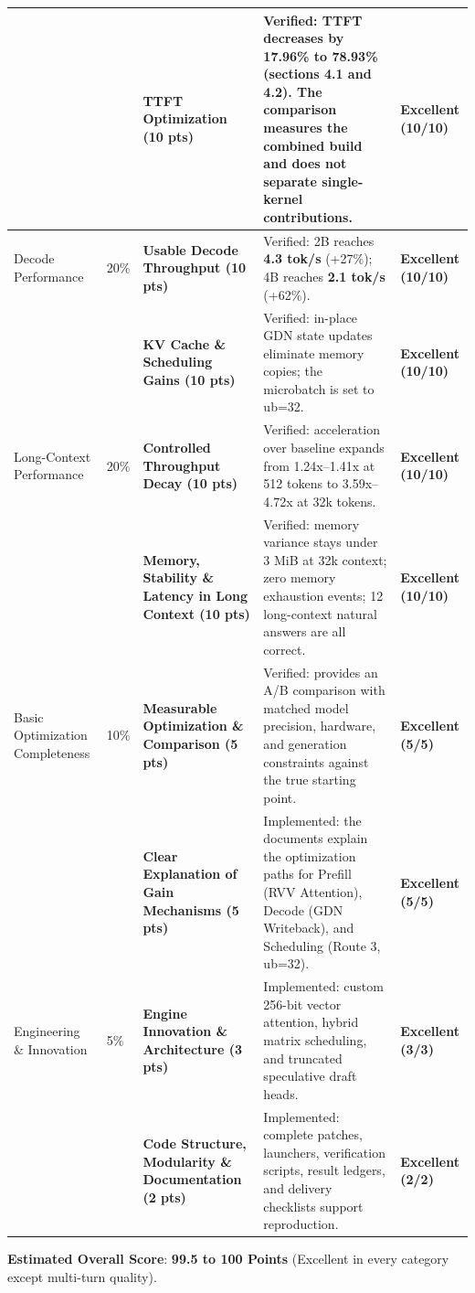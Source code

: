 \documentclass[10pt,a4paper]{article}
\begin{document}
\begin{scriptsize}
\begin{longtable}{@{}>{\raggedright\arraybackslash}p{2.6cm}p{1.1cm}p{4.1cm}p{5.7cm}p{2.5cm}@{}}
 & & \textbf{TTFT Optimization (10 pts)} & Verified: TTFT decreases by 17.96\% to 78.93\% (sections 4.1 and 4.2). The comparison measures the combined build and does not separate single-kernel contributions. & \textbf{Excellent (10/10)} \\
\midrule
Decode Performance & 20\% & \textbf{Usable Decode Throughput (10 pts)} & Verified: 2B reaches \textbf{4.3 tok/s} (+27\%); 4B reaches \textbf{2.1 tok/s} (+62\%). & \textbf{Excellent (10/10)} \\
 & & \textbf{KV Cache \& Scheduling Gains (10 pts)} & Verified: in-place GDN state updates eliminate memory copies; the microbatch is set to ub=32. & \textbf{Excellent (10/10)} \\
\midrule
Long-Context Performance & 20\% & \textbf{Controlled Throughput Decay (10 pts)} & Verified: acceleration over baseline expands from 1.24x--1.41x at 512 tokens to 3.59x--4.72x at 32k tokens. & \textbf{Excellent (10/10)} \\
 & & \textbf{Memory, Stability \& Latency in Long Context (10 pts)} & Verified: memory variance stays under 3 MiB at 32k context; zero memory exhaustion events; 12 long-context natural answers are all correct. & \textbf{Excellent (10/10)} \\
\midrule
Basic Optimization Completeness & 10\% & \textbf{Measurable Optimization \& Comparison (5 pts)} & Verified: provides an A/B comparison with matched model precision, hardware, and generation constraints against the true starting point. & \textbf{Excellent (5/5)} \\
 & & \textbf{Clear Explanation of Gain Mechanisms (5 pts)} & Implemented: the documents explain the optimization paths for Prefill (RVV Attention), Decode (GDN Writeback), and Scheduling (Route 3, ub=32). & \textbf{Excellent (5/5)} \\
\midrule
Engineering \& Innovation & 5\% & \textbf{Engine Innovation \& Architecture (3 pts)} & Implemented: custom 256-bit vector attention, hybrid matrix scheduling, and truncated speculative draft heads. & \textbf{Excellent (3/3)} \\
 & & \textbf{Code Structure, Modularity \& Documentation (2 pts)} & Implemented: complete patches, launchers, verification scripts, result ledgers, and delivery checklists support reproduction. & \textbf{Excellent (2/2)} \\
\bottomrule
\end{longtable}
\end{scriptsize}

\textbf{Estimated Overall Score}: \textbf{99.5 to 100 Points} (Excellent in every category except multi-turn quality).
\end{document}
